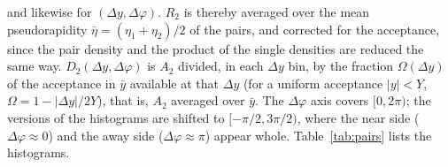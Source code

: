 and likewise for $(\Delta y,\Delta\varphi)$. $R_2$ is thereby averaged over the mean pseudorapidity
$\bar\eta=(\eta_1+\eta_2)/2$ of the pairs, and corrected for the acceptance, since the pair density and the product of
the single densities are reduced the same way. $D_2(\Delta y,\Delta\varphi)$ is $A_2$ divided, in each $\Delta y$ bin,
by the fraction $\Omega(\Delta y)$ of the acceptance in $\bar y$ available at that $\Delta y$ (for a uniform acceptance
$|y|<Y$, $\Omega = 1-|\Delta y|/2Y$), that is, $A_2$ averaged over $\bar y$. The $\Delta\varphi$ axis covers
$[0,2\pi)$; the versions  of the histograms are shifted to $[-\pi/2,3\pi/2)$, where the near side
($\Delta\varphi\approx 0$) and the away side ($\Delta\varphi\approx\pi$) appear whole. Table~\ref{tab:pairs} lists the
histograms.

